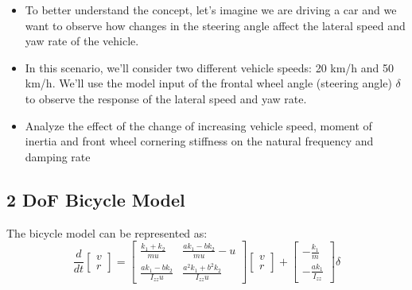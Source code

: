 \documentclass[UTF8,a4paper,11pt]{article}
\begin{document}
\begin{itemize}
\item To better understand the concept, let's imagine we are driving a car and we want to observe how changes in the steering angle affect the lateral speed and yaw rate of the vehicle.

\item In this scenario, we'll consider two different vehicle speeds: 20 km/h and 50 km/h. We'll use the model input of the frontal wheel angle (steering angle) $\delta$ to observe the response of the lateral speed and yaw rate.
\item 
Analyze the effect of the change of increasing vehicle speed, moment of inertia and front wheel cornering  stiffness on the natural frequency and damping rate
\end{itemize}

\subsection{2 DoF Bicycle Model}
The bicycle model can be represented as:
\begin{equation}
\frac{d}{dt}\begin{bmatrix}
 v\\
r
\end{bmatrix} 
=\begin{bmatrix}
 \frac{k_1+k_2}{mu}  & \frac{ak_1-bk_2}{mu}-u \\
 \frac{ak_1-bk_2}{I_{zz}u}  & \frac{a^2k_1+b^2k_2}{I_{zz}u} 
\end{bmatrix}
\begin{bmatrix}
 v\\
r
\end{bmatrix}
+\begin{bmatrix}
 -\frac{k_1}{m} \\
-\frac{ak_1}{I_{zz}} 
\end{bmatrix}
\delta 
\end{equation}
\end{document}
